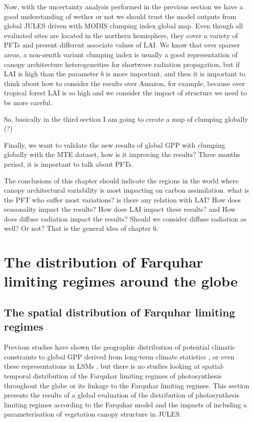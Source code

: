 \documentclass[a4paper,11pt]{report}
\begin{document}
Now, with the uncertainty analysis performed in the previous section we have a good understanding of wether or not we should trust the model outputs from global JULES driven with MODIS clumping index global map. Even though all evaluated sites are located in the northern hemisphere, they cover a variety of PFTs and present different associate values of LAI. We know that over sparser areas, a non-zenith variant clumping index is usually a good representation of canopy architecture heterogeneities for shortwave radiation propagation, but if LAI is high than the parameter $b$ is more important, and then it is important to think about how to consider the results over Amazon, for example, because over tropical forest LAI is so high and we consider the impact of structure we need to be more careful. 

So, basically in the third section I am going to create a map of clumping globally (?)

Finally, we want to validate the new results of global GPP with clumping globally with the MTE dataset, how is it improving the results? Three months period, it is important to talk about PFTs. 

The conclusions of this chapter should indicate the regions in the world where canopy architectural variability is most impacting on carbon assimilation. what is the PFT who suffer most variations? is there any relation with LAI? How does seasonality impact the results? How does LAI impact these results? and How does diffuse radiation impact the results? Should we consider diffuse radiation as well? Or not? That is the general idea of chapter 6.


\section{The distribution of Farquhar limiting regimes around the globe}\label{section:limiting_regimes}

\subsection{The spatial distribution of Farquhar limiting regimes}

Previous studies have shown the geographic distribution of potential climatic constraints to global GPP derived from long-term climate statistics \citep{nemani2003}, or even these representations in LSMs \citep{anav2015}, but there is no studies looking at spatial-temporal distribution of the Farquhar limiting regimes of photosynthesis throughout the globe or its linkage to the Farquhar limiting regimes. This section presents the results of a global evaluation of the distribution of photosynthesis limiting regimes according to the Farquhar model and the impacts of including a parameterisation of vegetation canopy structure in JULES.
\end{document}
